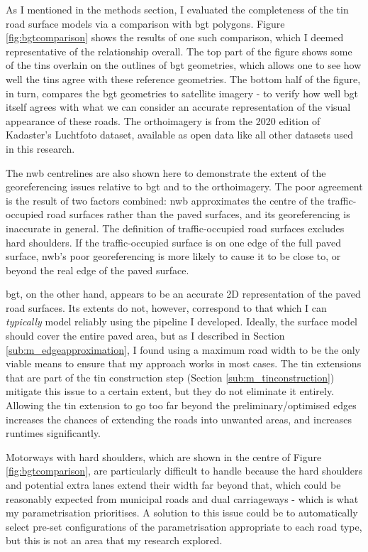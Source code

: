 As I mentioned in the methods section, I evaluated the completeness of the \ac{tin} road surface models via a comparison with \ac{bgt} polygons. Figure \ref{fig:bgtcomparison} shows the results of one such comparison, which I deemed representative of the relationship overall. The top part of the figure shows some of the \ac{tin}s overlain on the outlines of \ac{bgt} geometries, which allows one to see how well the \ac{tin}s agree with these reference geometries. The bottom half of the figure, in turn, compares the \ac{bgt} geometries to satellite imagery - to verify how well \ac{bgt} itself agrees with what we can consider an accurate representation of the visual appearance of these roads. The orthoimagery is from the 2020 edition of Kadaster's Luchtfoto dataset, available as open data like all other datasets used in this research.

The \ac{nwb} centrelines are also shown here to demonstrate the extent of the georeferencing issues relative to \ac{bgt} and to the orthoimagery. The poor agreement is the result of two factors combined: \ac{nwb} approximates the centre of the traffic-occupied road surfaces rather than the paved surfaces, and its georeferencing is inaccurate in general. The definition of traffic-occupied road surfaces excludes hard shoulders. If the traffic-occupied surface is on one edge of the full paved surface, \ac{nwb}'s poor georeferencing is more likely to cause it to be close to, or beyond the real edge of the paved surface.

\ac{bgt}, on the other hand, appears to be an accurate 2D representation of the paved road surfaces. Its extents do not, however, correspond to that which I can \textit{typically} model reliably using the pipeline I developed. Ideally, the surface model should cover the entire paved area, but as I described in Section \ref{sub:m_edgeapproximation}, I found using a maximum road width to be the only viable means to ensure that my approach works in most cases. The \ac{tin} extensions that are part of the \ac{tin} construction step (Section \ref{sub:m_tinconstruction}) mitigate this issue to a certain extent, but they do not eliminate it entirely. Allowing the \ac{tin} extension to go too far beyond the preliminary/optimised edges increases the chances of extending the roads into unwanted areas, and increases runtimes significantly.

Motorways with hard shoulders, which are shown in the centre of Figure \ref{fig:bgtcomparison}, are particularly difficult to handle because the hard shoulders and potential extra lanes extend their width far beyond that, which could be reasonably expected from municipal roads and dual carriageways - which is what my parametrisation prioritises. A solution to this issue could be to automatically select pre-set configurations of the parametrisation appropriate to each road type, but this is not an area that my research explored.

